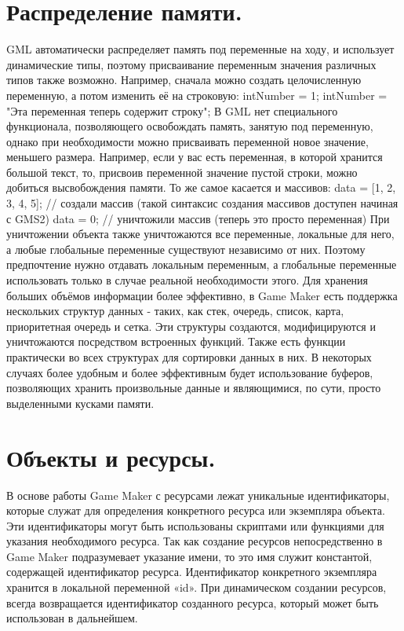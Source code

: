 \documentclass[14pt,article]{scrartcl}
\begin{document}
\section{Распределение памяти.}
GML автоматически распределяет память под переменные на ходу, и использует динамические типы, поэтому присваивание переменным значения различных типов также возможно. Например, сначала можно создать целочисленную переменную, а потом изменить её на строковую:
  intNumber = 1;
  intNumber = "Эта переменная теперь содержит строку";
В GML нет специального функционала, позволяющего освобождать память, занятую под переменную, однако при необходимости можно присваивать переменной новое значение, меньшего размера. Например, если у вас есть переменная, в которой хранится большой текст, то, присвоив переменной значение пустой строки, можно добиться высвобождения памяти. То же самое касается и массивов:
  data = [1, 2, 3, 4, 5]; // создали массив (такой синтаксис создания массивов доступен начиная с GMS2)
  data = 0; // уничтожили массив (теперь это просто переменная)
При уничтожении объекта также уничтожаются все переменные, локальные для него, а любые глобальные переменные существуют независимо от них. Поэтому предпочтение нужно отдавать локальным переменным, а глобальные переменные использовать только в случае реальной необходимости этого. Для хранения больших объёмов информации более эффективно, в Game Maker есть поддержка нескольких структур данных - таких, как стек, очередь, список, карта, приоритетная очередь и сетка. Эти структуры создаются, модифицируются и уничтожаются посредством встроенных функций. Также есть функции практически во всех структурах для сортировки данных в них. В некоторых случаях более удобным и более эффективным будет использование буферов, позволяющих хранить произвольные данные и являющимися, по сути, просто выделенными кусками памяти.
\section{Объекты и ресурсы.}
В основе работы Game Maker с ресурсами лежат уникальные идентификаторы, которые служат для определения конкретного ресурса или экземпляра объекта. Эти идентификаторы могут быть использованы скриптами или функциями для указания необходимого ресурса. Так как создание ресурсов непосредственно в Game Maker подразумевает указание имени, то это имя служит константой, содержащей идентификатор ресурса. Идентификатор конкретного экземпляра хранится в локальной переменной «id». При динамическом создании ресурсов, всегда возвращается идентификатор созданного ресурса, который может быть использован в дальнейшем.
\end{document}
